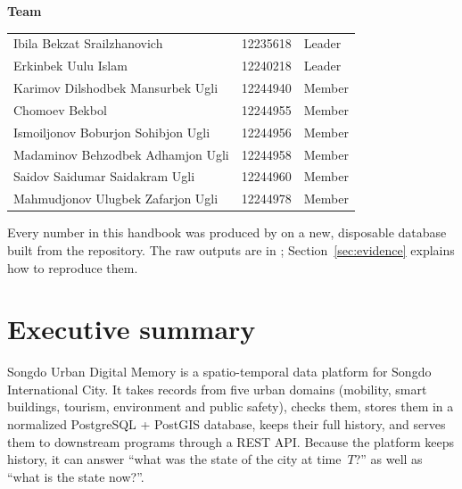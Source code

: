 \documentclass[11pt,a4paper]{article}
\newcommand{\cmd}[1]{\texttt{\detokenize{#1}}}
\begin{document}
\begin{titlepage}
\vspace{0.8cm}
{\bfseries\color{inha} Team}\par\vspace{0.2cm}
{\small
\begin{tabular}{@{}lll@{}}
Ibila Bekzat Srailzhanovich          & 12235618 & Leader \\
Erkinbek Uulu Islam                  & 12240218 & Leader \\
Karimov Dilshodbek Mansurbek Ugli    & 12244940 & Member \\
Chomoev Bekbol                       & 12244955 & Member \\
Ismoiljonov Boburjon Sohibjon Ugli   & 12244956 & Member \\
Madaminov Behzodbek Adhamjon Ugli    & 12244958 & Member \\
Saidov Saidumar Saidakram Ugli       & 12244960 & Member \\
Mahmudjonov Ulugbek Zafarjon Ugli    & 12244978 & Member \\
\end{tabular}\par}

\vfill
\begin{tcolorbox}[colback=codebg,colframe=rule,boxrule=0.4pt,arc=2pt]
\small Every number in this handbook was produced by \cmd{python scripts/evidence.py} on a
new, disposable database built from the repository. The raw outputs are in
; Section~\ref{sec:evidence} explains how to reproduce them.
\end{tcolorbox}
\end{titlepage}

\tableofcontents
\newpage
{}

\section{Executive summary}\label{sec:summary}

Songdo Urban Digital Memory is a spatio-temporal data platform for Songdo International City.
It takes records from five urban domains (mobility, smart buildings, tourism, environment
and public safety), checks them, stores them in a normalized PostgreSQL + PostGIS database,
keeps their full history, and serves them to downstream programs through a REST API.
Because the platform keeps history, it can answer ``what was the state of the city at
time~$T$?'' as well as ``what is the state now?''.
\end{document}
